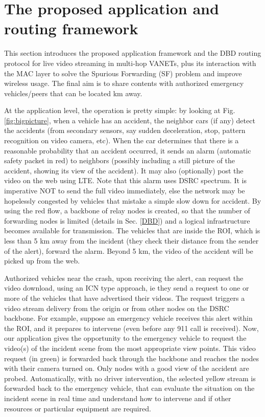 \documentclass{acm_proc_article-sp}
\begin{document}
\section{The proposed application and \\routing framework}
\label{proposal}

This section introduces the proposed application framework and the DBD routing protocol for live video streaming in multi-hop VANETs, plus its interaction with the MAC layer to solve the Spurious Forwarding (SF) problem and improve wireless usage. The final aim is to share contents with authorized emergency vehicles/peers that can be located km away.

At the application level, the operation is pretty simple: by looking at Fig. \ref{fig:bigpicture}, when a vehicle has an accident, the neighbor cars (if any) detect the accidents (from secondary sensors, say sudden deceleration, stop, pattern recognition on video camera, etc). When the car determines that there is a reasonable probability that an accident occurred, it sends an alarm (automatic safety packet in red) to neighbors (possibly including a still picture of the accident, showing its view of the accident). It may also (optionally) post the video on the web using LTE. Note that this alarm uses DSRC spectrum. It is imperative NOT to send the full video immediately, else the network may be hopelessly congested by vehicles that mistake a simple slow down for accident. By using the red flow, a backbone of relay nodes is created, so that the number of forwarding nodes is limited (details in Sec. \ref{DBD}) and a logical infrastructure becomes available for transmission. The vehicles that are inside the ROI, which is less than 5 km away from the incident (they check their distance from the sender of the alert), forward the alarm. Beyond 5 km, the video of the accident will be picked up from the web.

Authorized vehicles near the crash, upon receiving the alert, can request the video download, using an ICN type approach, ie they send a request to one or more of the vehicles that have advertised their videos. The request triggers a video stream delivery from the origin or from other nodes on the DSRC backbone. For example, suppose an emergency vehicle receives this alert within the ROI, and it prepares to intervene (even before  any 911 call is received). Now, our application gives the opportunity to the emergency vehicle to request the video(s) of the incident scene from the most appropriate view points. This video request (in green) is forwarded back through the backbone
and reaches the nodes with their camera turned on.
Only nodes with a good view of the accident are probed. Automatically, with no driver intervention, the selected
yellow stream is forwarded back to the emergency vehicle, that can evaluate the situation on the incident
scene in real time and understand how to intervene and if other resources or particular equipment are required.
\end{document}
